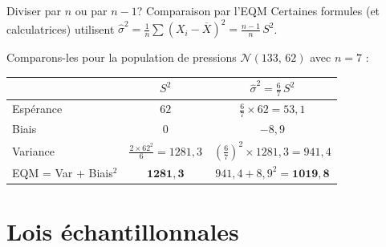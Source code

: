 \documentclass{BeamerTemplate}
\begin{document}
\begin{frame}[t]{Diviser par $n$ ou par $n-1$? Comparaison par l'EQM}
  Certaines formules (et calculatrices) utilisent $\hat{\sigma}^2 = \frac{1}{n}\sum (X_i - \overline{X})^2 = \frac{n-1}{n}\,S^2$.

  \smallskip
  Comparons-les pour la population de pressions $\mathcal{N}(133,\, 62)$ avec $n = 7$ :

  \smallskip
  \centering
  \small
  \renewcommand{\arraystretch}{1.15}
  \begin{tabular}{lcc}\toprule
    & $S^2$ & $\hat{\sigma}^2 = \frac{6}{7}\,S^2$ \\ \midrule
    Espérance & $62$ & $\frac{6}{7} \times 62 = 53{,}1$ \\
    Biais & $0$ & $-8{,}9$ \\
    Variance & $\frac{2 \times 62^2}{6} = 1281{,}3$ & $\left(\frac{6}{7}\right)^2 \times 1281{,}3 = 941{,}4$ \\
    \alert{EQM} = Var + Biais$^2$ & $\mathbf{1281{,}3}$ & $941{,}4 + 8{,}9^2 = \mathbf{1019{,}8}$ \\ \bottomrule
  \end{tabular}

  \raggedright
  \medskip

\end{frame}

\section{Lois échantillonnales}
\end{document}
